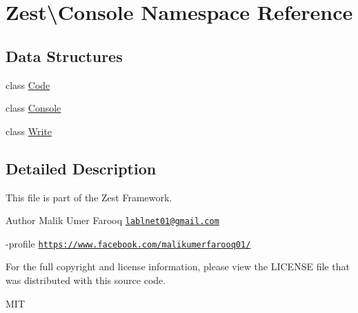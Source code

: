 \hypertarget{namespace_zest_1_1_console}{}\section{Zest\textbackslash{}Console Namespace Reference}
\label{namespace_zest_1_1_console}
\subsection*{Data Structures}
\begin{DoxyCompactItemize}
\item 
class \mbox{\hyperlink{class_zest_1_1_console_1_1_code}{Code}}
\item 
class \mbox{\hyperlink{class_zest_1_1_console_1_1_console}{Console}}
\item 
class \mbox{\hyperlink{class_zest_1_1_console_1_1_write}{Write}}
\end{DoxyCompactItemize}


\subsection{Detailed Description}
This file is part of the Zest Framework.

\begin{DoxyAuthor}{Author}
Malik Umer Farooq \href{mailto:lablnet01@gmail.com}{\tt lablnet01@gmail.\+com} 

-\/profile \href{https://www.facebook.com/malikumerfarooq01/}{\tt https\+://www.\+facebook.\+com/malikumerfarooq01/}
\end{DoxyAuthor}
For the full copyright and license information, please view the L\+I\+C\+E\+N\+SE file that was distributed with this source code.

M\+IT 